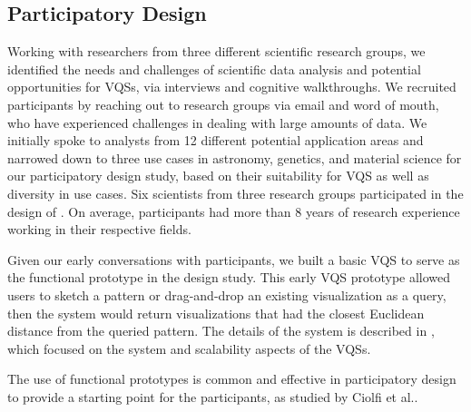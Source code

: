 \subsection{Participatory Design}
\par  Working with researchers from three different scientific research groups, we identified the needs and challenges of scientific data analysis and potential opportunities for VQSs, via interviews and cognitive walkthroughs. We recruited participants by reaching out to research groups via email and word of mouth, who have experienced challenges in dealing with large amounts of data. We initially spoke to analysts from 12 different potential application areas and narrowed down to three use cases in astronomy, genetics, and material science for our participatory design study, based on their suitability for VQS as well as diversity in use cases. Six scientists from three research groups participated in the design of \zv. On average, participants had more than 8 years of research experience working in their respective fields. %
\par Given our early conversations with participants, we built a basic VQS to serve as the functional prototype in the design study. This early VQS prototype allowed users to sketch a pattern or drag-and-drop an existing visualization as a query, then the system would return visualizations that had the closest Euclidean distance from the queried pattern. The details of the system is described in \cite{Siddiqui2017,Siddiqui2017VLDB}, which focused on the system and scalability aspects of the VQSs.
\par The use of functional prototypes is common and effective in participatory design to provide a starting point for the participants, as studied by Ciolfi et al.\cite{Ciolfi2016}. %
